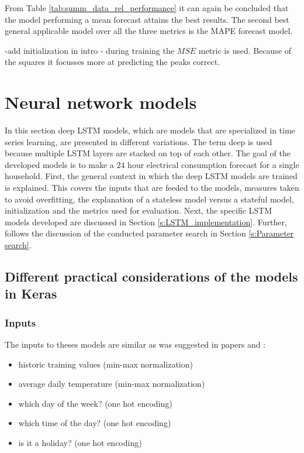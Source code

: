 From Table \ref{tab:summ_data_rel_performance} it can again be concluded that the model performing a mean forecast attains the best results. The second best general applicable model over all the three metrics is the MAPE forecast model.

-add initialization in intro
- during training the $ MSE $ metric is used. Because of the squares it focusses more at predicting the peaks correct. 

\section{Neural network models}\label{s:Neural network models}
In this section deep LSTM models, which are models that are specialized in time series learning, are presented in different variations. The term deep is used because multiple LSTM layers are stacked on top of each other. The goal of the developed models is to make a $ 24 $ hour electrical consumption forecast for a single household. First, the general context in which the deep LSTM models are trained is explained. This covers the inputs that are feeded to the models, measures taken to avoid overfitting, the explanation of a stateless model versus a stateful model, initialization and the metrics used for evaluation. Next, the specific LSTM models developed are discussed in Section \ref{s:LSTM_implementation}. Further, follows  the discussion of the conducted parameter search in Section \ref{s:Parameter search}.

\subsection{Different practical considerations of the models in Keras}

\subsubsection{Inputs}\label{s:Inputs}
The inputs to theses models are similar as was suggested in papers \cite{loadforecastingmoor} and \cite{Kong2019}: 
\begin{itemize}
	\item historic training values (min-max normalization)
	\item average daily temperature (min-max normalization)
	\item which day of the week? (one hot encoding)
	\item which time of the day? (one hot encoding)
	\item is it a holiday? (one hot encoding)
\end{itemize}

